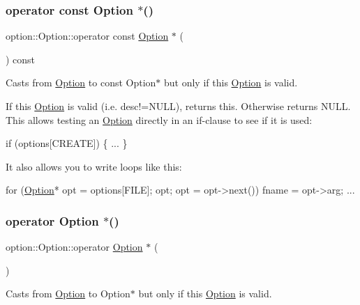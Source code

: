 \subsubsection{\texorpdfstring{operator const Option $\ast$()}{operator const Option *()}}
{\footnotesize\ttfamily option\+::\+Option\+::operator const \hyperlink{classoption_1_1Option}{Option} $\ast$ (\begin{DoxyParamCaption}{ }\end{DoxyParamCaption}) const\hspace{0.3cm}{\ttfamily [inline]}}



Casts from \hyperlink{classoption_1_1Option}{Option} to const Option$\ast$ but only if this \hyperlink{classoption_1_1Option}{Option} is valid. 

If this \hyperlink{classoption_1_1Option}{Option} is valid (i.\+e. {\ttfamily desc!=N\+U\+LL}), returns this. Otherwise returns N\+U\+LL. This allows testing an \hyperlink{classoption_1_1Option}{Option} directly in an if-\/clause to see if it is used\+: 
\begin{DoxyCode}
\textcolor{keywordflow}{if} (options[CREATE])
\{
  ...
\}
\end{DoxyCode}
 It also allows you to write loops like this\+: 
\begin{DoxyCode}
\textcolor{keywordflow}{for} (\hyperlink{classoption_1_1Option_aa2810152fc23b14175b115d1a7d38095}{Option}* opt = options[FILE]; opt; opt = opt->next())
 fname = opt->arg; ... 
\end{DoxyCode}
 \mbox{\label{classoption_1_1Option_ac5b9235d79208035d97e41fe17ba04d6}} 
\subsubsection{\texorpdfstring{operator Option $\ast$()}{operator Option *()}}
{\footnotesize\ttfamily option\+::\+Option\+::operator \hyperlink{classoption_1_1Option}{Option} $\ast$ (\begin{DoxyParamCaption}{ }\end{DoxyParamCaption})\hspace{0.3cm}{\ttfamily [inline]}}



Casts from \hyperlink{classoption_1_1Option}{Option} to Option$\ast$ but only if this \hyperlink{classoption_1_1Option}{Option} is valid. 

